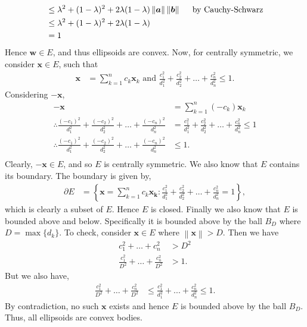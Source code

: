 \documentclass[a4paper,11pt]{article}
\newcommand{\norm}[1]{\left\lVert#1\right\rVert}
\newcommand{\ds}{\displaystyle}
\begin{document}
{{\begin{enumerate}[leftmargin=*]
\begin{enumerate}
\begin{align*}
			& \leq \lambda^2 + (1 - \lambda)^2 + 2\lambda(1 - \lambda) \norm{\bm{a}} \norm{\bm{b}} \hspace{5mm} \text{by Cauchy-Schwarz} \\
			& \leq \lambda^2 + (1 - \lambda)^2 + 2\lambda(1 - \lambda) \\
			& = 1
					\end{align*}
					Hence $\ds{\bm{w} \in E}$, and thus ellipsoids are convex.
					Now, for centrally symmetric, we consider $\ds{\bm{x} \in E}$, such that
					\begin{align*}
						\bm{x} & = \sum_{k = 1}^n c_k \bm{x}_k \text{ and } \frac{c_1^2}{d_1^2} + \frac{c_2^2}{d_2^2} + \dots + \frac{c_n^2}{d_n^2} \leq 1.
					\end{align*}
					Considering $\ds{-\bm{x}}$, 
					\begin{align*}
						-\bm{x} & = \sum_{k = 1}^n (-c_k) \bm{x}_k\\
						\therefore \frac{(-c_1)^2}{d_1^2} + \frac{(-c_2)^2}{d_2^2} + \dots + \frac{(-c_n)^2}{d_n^2} & = \frac{c_1^2}{d_1^2} + \frac{c_2^2}{d_2^2} + \dots + \frac{c_n^2}{d_n^2} \leq 1\\
				  \therefore \frac{(-c_1)^2}{d_1^2} + \frac{(-c_2)^2}{d_2^2} + \dots + \frac{(-c_n)^2}{d_n^2} & \leq 1.\\
					\end{align*}
					Clearly, $\ds{-\bm{x} \in E}$, and so $\ds{E}$ is centrally symmetric. We also know that $\ds{E}$ contains its boundary. The boundary is given by,
					\begin{align*}
						\partial E & = \left\{ \bm{x} = \sum_{k = 1}^n c_k \bm{x_k} : \frac{c_1^2}{d_1^2} + \frac{c_2^2}{d_2^2} + \dots + \frac{c_n^2}{d_n^2} = 1 \right\},
					\end{align*}
					which is clearly a subset of $\ds{E}$. Hence $\ds{E}$ is closed. Finally we also know that $\ds{E}$ is bounded above and below. Specifically it is bounded above by the ball $\ds{B_D}$ where $\ds{D = \max\{d_k\}}$. To check, consider $\ds{\bm{x} \in E}$ where $\ds{\norm{\bm{x}} > D}$. Then we have
					\begin{align*}
						c_1^2 + \dots + c_n^2 & > D^2 \\
						\frac{c_1^2}{D^2} + \dots + \frac{c_n^2}{D^2} & > 1.
					\end{align*}
					But we also have,
					\begin{align*}
						\frac{c_1^2}{D^2} + \dots+ \frac{c_n^2}{D^2} & \leq \frac{c_1^2}{d_1^2} + ... + \frac{c_n^2}{d_n^2} \leq 1.
					\end{align*}
					By contradiction, no such $\ds{\bm{x}}$ exists and hence $\ds{E}$ is bounded above by the ball $\ds{B_D}$. Thus, all ellipsoids are convex bodies.



\end{enumerate}
\end{enumerate}}}
\end{document}
